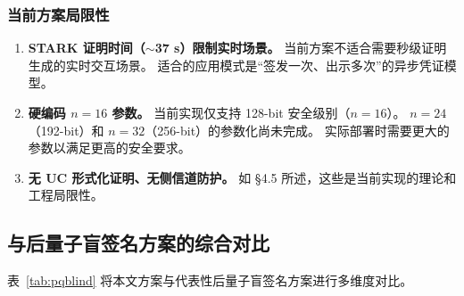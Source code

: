 \documentclass[11pt,a4paper]{ctexart}
\begin{document}
\subsubsection{当前方案局限性}

\begin{enumerate}[leftmargin=*]
\item \textbf{STARK 证明时间（$\sim$37 s）限制实时场景。}
当前方案不适合需要秒级证明生成的实时交互场景。
适合的应用模式是``签发一次、出示多次''的异步凭证模型。
\item \textbf{硬编码 $n=16$ 参数。}
当前实现仅支持 128-bit 安全级别（$n=16$）。
$n=24$（192-bit）和 $n=32$（256-bit）的参数化尚未完成。
实际部署时需要更大的参数以满足更高的安全要求。
\item \textbf{无 UC 形式化证明、无侧信道防护。}
如 §4.5 所述，这些是当前实现的理论和工程局限性。
\end{enumerate}

\subsection{与后量子盲签名方案的综合对比}

表~\ref{tab:pqblind} 将本文方案与代表性后量子盲签名方案进行多维度对比。
\end{document}

